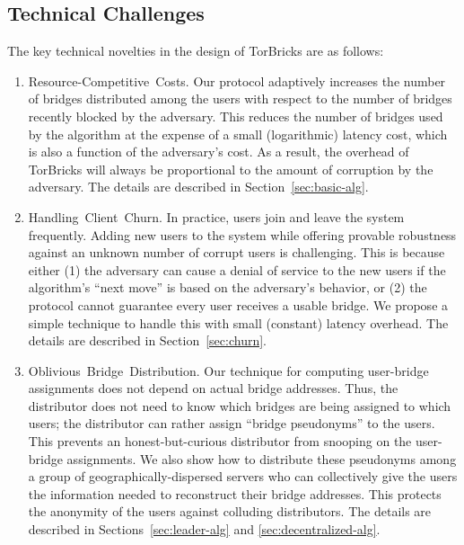 \documentclass{sig-alternate-05-2015}
\newcommand{\fullpaper}[1]{#1}
\newcommand{\fullpaper}[1]{}
\newcommand{\bricks}{}
\def\bricks/{\mbox{TorBricks}}
\newcommand{\sfsize}{\fontsize{0.8\baselineskip}{0.68\baselineskip}\selectfont}
\newcommand{\sans}[1]{\textsf{\sfsize \mbox{#1}}}
\begin{document}
\subsection{Technical Challenges} 
The key technical novelties in the design of \bricks/ are as follows:
\begin{enumerate}[leftmargin=1.7em, itemsep=0.7em, topsep=0.6em]
	\item \sans{Resource-Competitive Costs.} Our protocol adaptively increases the number of bridges distributed among the users with respect to the number of bridges recently blocked by the adversary. This reduces the number of bridges used by the algorithm at the expense of a small (logarithmic) latency cost, which is also a function of the adversary's cost. As a result, the overhead of \bricks/ will always be proportional to the amount of corruption by the adversary. The details are described in Section~\ref{sec:basic-alg}.  %
	
	\item \sans{Handling Client Churn.} In practice, users join and leave the system frequently. Adding new users to the system while offering provable robustness against an unknown number of corrupt users is challenging. This is because either (1) the adversary can cause a denial of service to the new users if the algorithm's ``next move'' is based on the adversary's behavior, or (2) the protocol cannot guarantee every user receives a usable bridge. We propose a simple technique to handle this with small (constant) latency overhead. The details are described in Section~\ref{sec:churn}.	
	
	\item \sans{Oblivious Bridge Distribution.} Our technique for computing user-bridge assignments does not depend on actual bridge addresses. Thus, \fullpaper{the distributor does not need to know which bridges are being assigned to which users;} the distributor can \fullpaper{rather} assign ``bridge pseudonyms'' to the users. This prevents an honest-but-curious distributor from snooping on the user-bridge assignments.
	We also show how to distribute these pseudonyms among a group of geographically-dispersed servers who can collectively give the users the information needed to reconstruct their bridge addresses. This protects the anonymity of the users against colluding distributors. The details are described in Sections~\ref{sec:leader-alg} and \ref{sec:decentralized-alg}.
	

\end{enumerate}
\end{document}
